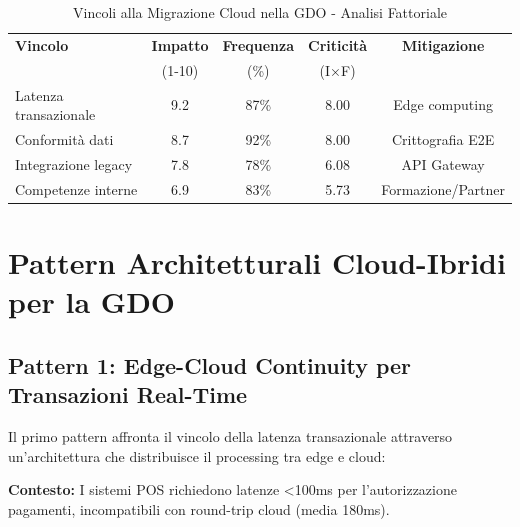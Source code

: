 \begin{table}[htbp]
\centering
\caption{Vincoli alla Migrazione Cloud nella GDO - Analisi Fattoriale}
\label{tab:migration_constraints}
\begin{tabular}{lcccc}
\toprule
\textbf{Vincolo} & \textbf{Impatto} & \textbf{Frequenza} & \textbf{Criticità} & \textbf{Mitigazione} \\
& (1-10) & (\%) & (I×F) & \\
\midrule
Latenza transazionale & 9.2 & 87\% & 8.00 & Edge computing \\
Conformità dati & 8.7 & 92\% & 8.00 & Crittografia E2E \\
Integrazione legacy & 7.8 & 78\% & 6.08 & API Gateway \\
Competenze interne & 6.9 & 83\% & 5.73 & Formazione/Partner \\
\bottomrule
\end{tabular}
\end{table}

\section{\texorpdfstring{Pattern Architetturali Cloud-Ibridi per la GDO}{3.3 - Pattern Architetturali Cloud-Ibridi per la GDO}}

\subsection{\texorpdfstring{Pattern 1: Edge-Cloud Continuity per Transazioni Real-Time}{3.3.1 - Pattern 1: Edge-Cloud Continuity per Transazioni Real-Time}}

Il primo pattern affronta il vincolo della latenza transazionale attraverso un'architettura che distribuisce il processing tra edge e cloud:

\textbf{Contesto:}
I sistemi POS richiedono latenze <100ms per l'autorizzazione pagamenti, incompatibili con round-trip cloud (media 180ms).

